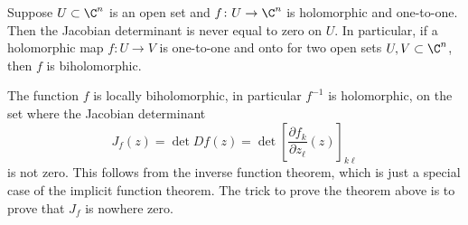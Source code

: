 \begin{theorem}
Suppose $U\subset\C^n$ is an open set and $f\colon U\to\C^n$ is holomorphic and one-to-one. Then the Jacobian determinant is never equal to zero on $U$.
In particular, if a holomorphic map $f\colon U\to V$ is one-to-one and onto for two open sets $U,V\subset\C^n$, then $f$ is biholomorphic.
\end{theorem}
The function $f$ is locally biholomorphic, in particular $f^{-1}$ is holomorphic, on the set where the Jacobian determinant
\[J_f(z)=\det Df(z)=\det\left[\frac{\partial f_k}{\partial z_\ell}(z)\right]_{k\ell}\]
is not zero. This follows from the inverse function theorem, which is just a special case of the implicit function theorem. The trick to prove the theorem above is to prove that $J_f$ is nowhere zero.

